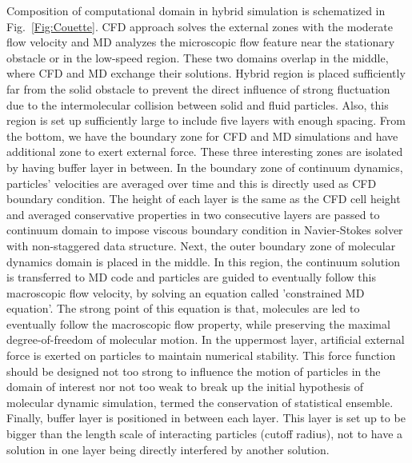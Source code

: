 \documentclass[conference,final]{IEEEtran}
\begin{document}


Composition of computational domain in hybrid simulation is schematized in Fig.~\ref{Fig:Couette}. CFD approach solves the external zones with the moderate flow velocity and MD analyzes the microscopic flow feature near the stationary obstacle or in the low-speed region. These two domains overlap in the middle, where CFD and MD exchange their solutions. Hybrid region is placed sufficiently far from the solid obstacle to prevent the direct influence of strong fluctuation due to the intermolecular collision between solid and fluid particles. Also, this region is set up sufficiently large to include five layers with enough spacing. From the bottom, we have the boundary zone for CFD and MD simulations and have additional zone to exert external force. These three interesting zones are isolated by having buffer layer in between. In the boundary zone of continuum dynamics, particles' velocities are averaged over time and this is directly used as CFD boundary condition. The height of each layer is the same as the CFD cell height and averaged conservative properties in two consecutive layers are passed to continuum domain to impose viscous boundary condition in Navier-Stokes solver with non-staggered data structure. Next, the outer boundary zone of molecular dynamics domain is placed in the middle. In this region, the continuum solution is transferred to MD code and particles are guided to eventually follow this macroscopic flow velocity, by solving an equation called 'constrained MD equation'. The strong point of this equation is that, molecules are led to eventually follow the macroscopic flow property, while preserving the maximal degree-of-freedom of molecular motion. In the uppermost layer, artificial external force is exerted on particles to maintain numerical stability. This force function should be designed not too strong to influence the motion of particles in the domain of interest nor not too weak to break up the initial hypothesis of molecular dynamic simulation, termed the conservation of statistical ensemble. Finally, buffer layer is positioned in between each layer. This layer is set up to be bigger than the length scale of interacting particles (cutoff radius), not to have a solution in one layer being directly interfered by another solution.
\end{document}

